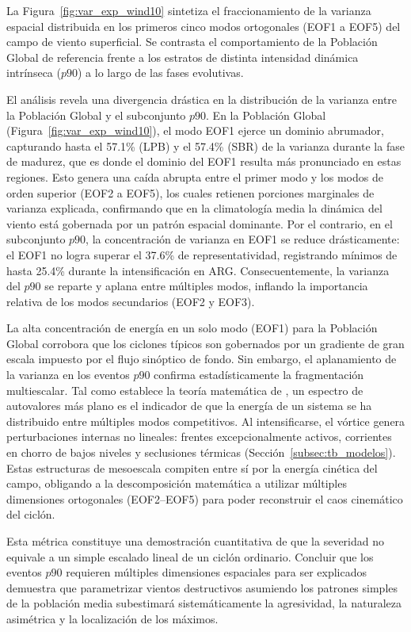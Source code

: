 La Figura~\ref{fig:var_exp_wind10} sintetiza el fraccionamiento de la varianza espacial distribuida en los primeros cinco modos ortogonales (EOF1 a EOF5) del campo de viento superficial. 
Se contrasta el comportamiento de la Población Global de referencia frente a los estratos de distinta intensidad dinámica intrínseca ($p90$) a lo largo de las fases evolutivas.

El análisis revela una divergencia drástica en la distribución de la varianza entre la Población Global y el subconjunto $p90$. 
En la Población Global (Figura~\ref{fig:var_exp_wind10}), el modo EOF1 ejerce un dominio abrumador, capturando hasta el 57.1\% (LPB) y el 57.4\% (SBR) de la varianza durante la fase de madurez, que es donde el dominio del EOF1 resulta más pronunciado en estas regiones. 
Esto genera una caída abrupta entre el primer modo y los modos de orden superior (EOF2 a EOF5), los cuales retienen porciones marginales de varianza explicada, confirmando que en la climatología media la dinámica del viento está gobernada por un patrón espacial dominante. 
Por el contrario, en el subconjunto $p90$, la concentración de varianza en EOF1 se reduce drásticamente: el EOF1 no logra superar el 37.6\% de representatividad, registrando mínimos de hasta 25.4\% durante la intensificación en ARG. 
Consecuentemente, la varianza del $p90$ se reparte y aplana entre múltiples modos, inflando la importancia relativa de los modos secundarios (EOF2 y EOF3).

La alta concentración de energía en un solo modo (EOF1) para la Población Global corrobora que los ciclones típicos son gobernados por un gradiente de gran escala impuesto por el flujo sinóptico de fondo. 
Sin embargo, el aplanamiento de la varianza en los eventos $p90$ confirma estadísticamente la fragmentación multiescalar. 
Tal como establece la teoría matemática de \citet{hannachi2007empirical}, un espectro de autovalores más plano es el indicador de que la energía de un sistema se ha distribuido entre múltiples modos competitivos. 
Al intensificarse, el vórtice genera perturbaciones internas no lineales: frentes excepcionalmente activos, corrientes en chorro de bajos niveles y seclusiones térmicas (Sección~\ref{subsec:tb_modelos}). 
Estas estructuras de mesoescala compiten entre sí por la energía cinética del campo, obligando a la descomposición matemática a utilizar múltiples dimensiones ortogonales (EOF2--EOF5) para poder reconstruir el caos cinemático del ciclón.

Esta métrica constituye una demostración cuantitativa de que la severidad no equivale a un simple escalado lineal de un ciclón ordinario. 
Concluir que los eventos $p90$ requieren múltiples dimensiones espaciales para ser explicados demuestra que parametrizar vientos destructivos asumiendo los patrones simples de la población media subestimará sistemáticamente la agresividad, la naturaleza asimétrica y la localización de los máximos.

